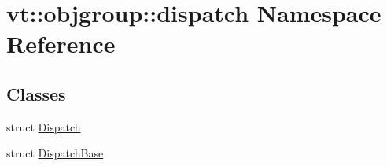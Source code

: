 \hypertarget{namespacevt_1_1objgroup_1_1dispatch}{}\section{vt\+:\+:objgroup\+:\+:dispatch Namespace Reference}
\label{namespacevt_1_1objgroup_1_1dispatch}
\subsection*{Classes}
\begin{DoxyCompactItemize}
\item 
struct \hyperlink{structvt_1_1objgroup_1_1dispatch_1_1_dispatch}{Dispatch}
\item 
struct \hyperlink{structvt_1_1objgroup_1_1dispatch_1_1_dispatch_base}{Dispatch\+Base}
\end{DoxyCompactItemize}
